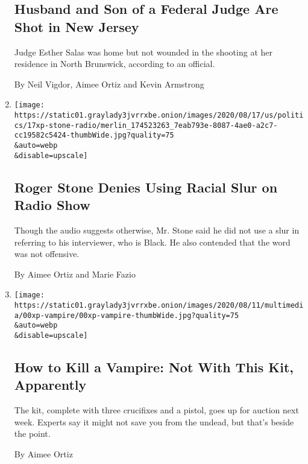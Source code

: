 \begin{enumerate}
  \hypertarget{husband-and-son-of-a-federal-judge-are-shot-in-new-jersey}{%
  \subsection{Husband and Son of a Federal Judge Are Shot in New
  Jersey}\label{husband-and-son-of-a-federal-judge-are-shot-in-new-jersey}}

  Judge Esther Salas was home but not wounded in the shooting at her
  residence in North Brunswick, according to an official.

  By Neil Vigdor, Aimee Ortiz and Kevin Armstrong
\item
  \href{/2020/07/19/us/politics/roger-stone-mo-kelly-slur.html}{}

  \texttt{[image: https://static01.graylady3jvrrxbe.onion/images/2020/08/17/us/politics/17xp-stone-radio/merlin\_174523263\_7eab793e-8087-4ae0-a2c7-cc19582c5424-thumbWide.jpg?quality=75\\\&auto=webp\\\&disable=upscale]}

  \hypertarget{roger-stone-denies-using-racial-slur-on-radio-show}{%
  \subsection{Roger Stone Denies Using Racial Slur on Radio
  Show}\label{roger-stone-denies-using-racial-slur-on-radio-show}}

  Though the audio suggests otherwise, Mr. Stone said he did not use a
  slur in referring to his interviewer, who is Black. He also contended
  that the word was not offensive.

  By Aimee Ortiz and Marie Fazio
\item
  \href{/2020/07/18/arts/vampire-slaying-kit-auction-uk.html}{}

  \texttt{[image: https://static01.graylady3jvrrxbe.onion/images/2020/08/11/multimedia/00xp-vampire/00xp-vampire-thumbWide.jpg?quality=75\\\&auto=webp\\\&disable=upscale]}

  \hypertarget{how-to-kill-a-vampire-not-with-this-kit-apparently}{%
  \subsection{How to Kill a Vampire: Not With This Kit,
  Apparently}\label{how-to-kill-a-vampire-not-with-this-kit-apparently}}

  The kit, complete with three crucifixes and a pistol, goes up for
  auction next week. Experts say it might not save you from the undead,
  but that's beside the point.

  By Aimee Ortiz
\end{enumerate}

